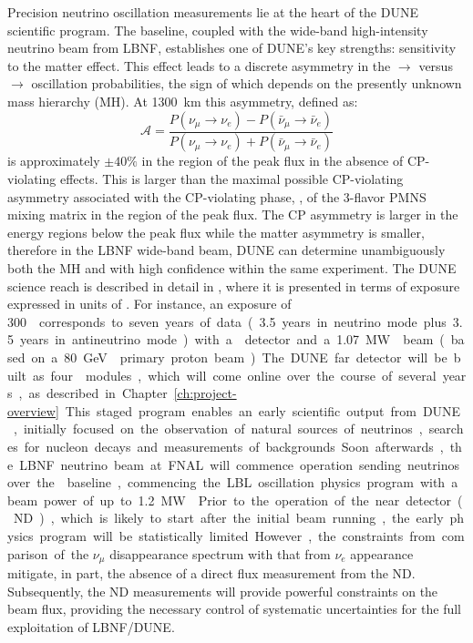 Precision neutrino oscillation measurements lie at the heart of the DUNE scientific program.
The  baseline, coupled with the wide-band
high-intensity neutrino beam from LBNF, establishes one of DUNE's key
strengths: sensitivity to the matter effect. This effect leads to a
discrete asymmetry in the \numu $\to$ \nue versus \anumu $\to$ \anue
oscillation probabilities, the sign of which depends on the presently
unknown mass hierarchy (MH).  At \SI{1300}{\km} this asymmetry, defined as:
\begin{equation}
\mathcal{A} = \frac{ P(\nu_\mu \rightarrow \nu_e)-P(\bar{\nu}_\mu \rightarrow \bar{\nu}_e)}{P(\nu_\mu \rightarrow \nu_e)+P(\bar{\nu}_\mu \rightarrow \bar{\nu}_e)}
\end{equation}
is approximately $\pm 40\%$ in the region of the peak flux in the
absence of CP-violating effects. This is larger than the maximal
possible CP-violating asymmetry associated with the CP-violating
phase, \deltacp, of the 3-flavor PMNS mixing matrix in the region of
the peak flux. The CP asymmetry is larger in the energy regions below the peak
flux while the matter asymmetry is smaller, therefore in the LBNF
wide-band beam, DUNE can determine unambiguously both the MH and
\deltacp with high confidence within the same experiment.
The DUNE science reach is described in detail in \volphys, where it is presented 
in terms of  exposure expressed in units of \ktMWyr{}. For instance, an
exposure of \SI{300}\ktMWyr{} corresponds to seven years of data
(\num{3.5} years in neutrino mode plus \num{3.5} years in antineutrino
mode) with a  detector and a \SI{1.07}\MW{} beam (based on a \SI{80}\GeV{} primary proton beam).

The DUNE far detector will be built as four  modules, which will
come online over the course of several years, as described in Chapter~\ref{ch:project-overview}. 
This staged program enables an early scientific output from DUNE, 
initially focused on the observation of natural
sources of neutrinos, searches for nucleon decays and 
measurements of backgrounds. Soon afterwards, the LBNF neutrino
beam at FNAL will commence operation sending neutrinos over the 
baseline, commencing the LBL oscillation physics program with a beam power of up to \SI{1.2}\MW{}. 
Prior to the operation of the near detector (ND), which
is likely to start after the initial beam running, the early physics program
will be statistically limited. However, the constraints from comparison of the $\nu_\mu$
disappearance spectrum with that from $\nu_e$ appearance mitigate, in part,
the absence of a direct flux measurement from the ND. Subsequently, the ND
measurements will provide powerful constraints on the beam flux, providing the
necessary control of systematic uncertainties for the full exploitation of LBNF/DUNE. 

